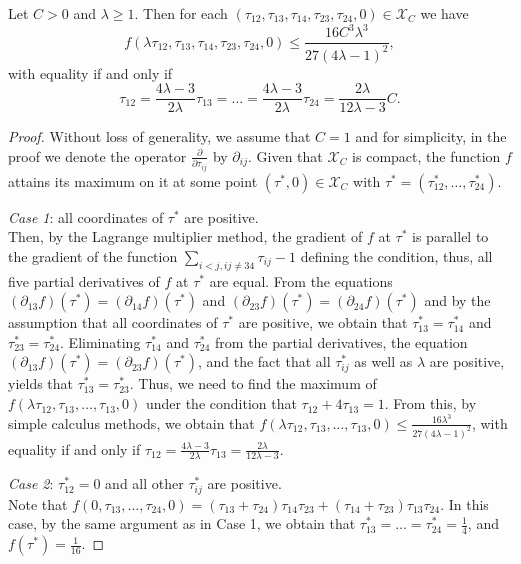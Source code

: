 \documentclass[10pt,a4paper]{amsart}
\begin{document}
\begin{lem}\label{lem:computations2}
Let $C > 0$ and $\lambda \geq 1$. Then for each $(\tau_{12},\tau_{13},\tau_{14},\tau_{23},\tau_{24},0)\in \mathcal{X}_C$ we have 
\begin{equation}\label{ineq:g}
 f(\lambda \tau_{12},\tau_{13},\tau_{14},\tau_{23},\tau_{24},0) \leq \frac{16C^3 \lambda^3}{27(4\lambda - 1)^2},
\end{equation}
with equality if and only if
\[
\tau_{12} = \frac{4 \lambda - 3}{2\lambda}\tau_{13} = \ldots = \frac{4 \lambda - 3}{2\lambda} \tau_{24} = \frac{2 \lambda}{12 \lambda - 3}C.
\]
\end{lem}

\begin{proof}
Without loss of generality, we assume that $C=1$ and for simplicity, in the proof we denote the operator $\frac{\partial}{\partial \tau_{ij}}$ by $\partial_{ij}$.
Given that $\mathcal{X}_C$ is compact, the function $f$ attains its maximum on it at some point $(\tau^*,0) \in \mathcal{X}_C$ with $\tau^*=(\tau^*_{12}, \ldots, \tau_{24}^*)$.

\emph{Case 1}: all coordinates of $\tau^*$ are positive.\\
Then, by the Lagrange multiplier method, the gradient of $f$ at $\tau^*$ is parallel to the gradient of the function $\sum_{i < j, ij \neq 34} \tau_{ij}-1$ defining the condition, thus, all five partial derivatives of $f$ at $\tau^*$ are equal. 
From the equations $(\partial_{13} f)(\tau^*) = (\partial_{14} f)(\tau^*)$ and $(\partial_{23} f)(\tau^*) = (\partial_{24} f)(\tau^*)$ and by the assumption that all coordinates of $\tau^*$ are positive, we obtain that $\tau_{13}^* = \tau_{14}^*$ and $\tau_{23}^* = \tau_{24}^*$. Eliminating $\tau_{14}^*$ and $\tau_{24}^*$ from the partial derivatives, the equation $(\partial_{13} f)(\tau^*) = (\partial_{23} f)(\tau^*)$, and the fact that all $\tau_{ij}^*$ as well as $\lambda$ are positive, yields that $\tau_{13}^*=\tau_{23}^*$. Thus, we need to find the maximum of $f(\lambda \tau_{12},\tau_{13},\ldots,\tau_{13},0)$ under the condition that $\tau_{12} + 4 \tau_{13} = 1$. From this, by simple calculus methods, we obtain that $f(\lambda \tau_{12},\tau_{13},\ldots,\tau_{13},0) \leq \frac{16 \lambda^3}{27(4\lambda - 1)^2}$, with equality if and only if $\tau_{12} = \frac{4 \lambda - 3}{2\lambda}\tau_{13} = \frac{2 \lambda}{12 \lambda - 3}$.

\emph{Case 2}: $\tau_{12}^* = 0$ and all other $\tau_{ij}^*$ are positive.\\
Note that $f(0,\tau_{13},\ldots,\tau_{24},0) = (\tau_{13}+\tau_{24})\tau_{14}\tau_{23}+(\tau_{14}+\tau_{23})\tau_{13}\tau_{24}$. In this case, by the same argument as in Case 1, we obtain that $\tau_{13}^*=\ldots=\tau_{24}^*=\frac{1}{4}$, and $f(\tau^*)=\frac{1}{16}$. 


\end{proof}
\end{document}
